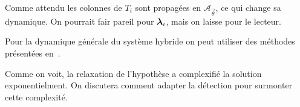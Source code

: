 \documentclass[../main.tex]{subfiles}
\begin{document}
Comme attendu les colonnes de $T_{i}$ sont propagées en $\mathcal{A}_{\vec{\theta}}$, ce qui change sa dynamique.
On pourrait fair pareil pour $\boldsymbol{\lambda}_{i}$, mais on laisse pour le lecteur.

Pour la dynamique générale du système hybride on peut utiliser des méthodes présentées en~\cite{BorrelliEtAl2017}.

Comme on voit, la relaxation de l'hypothèse a complexifié la solution exponentielment.
On discutera comment adapter la détection pour surmonter cette complexité.
\end{document}
